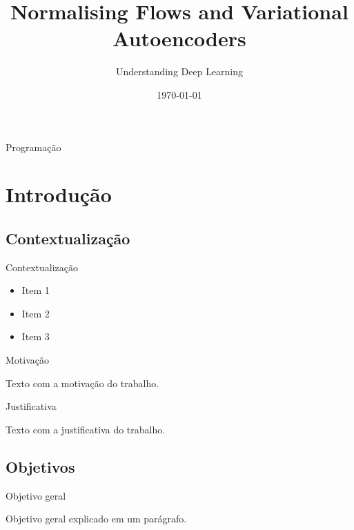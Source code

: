 \documentclass{if-beamer}
\title[Normalising Flows and Variational Autoencoders]{\textbf{Normalising Flows and Variational Autoencoders}}
\subtitle{Understanding Deep Learning}
\institute[Uni OS]{
    \small \textit{University of Osnabrück} \\
    \textit{Koray Geciml, Elias Brand, Hajar Fatane}
}
\date{\today}
\begin{document}
\begin{frame}
  \titlepage
\end{frame}

\begin{frame}{Programação}
  \tableofcontents
\end{frame}



\section{Introdução}

\subsection{Contextualização}
\begin{frame}{Contextualização}

    \begin{itemize}
        \item Item 1
        \item Item 2
        \item Item 3
    \end{itemize}

\end{frame}

\begin{frame}{Motivação}

    Texto com a motivação do trabalho.

\end{frame}

\begin{frame}{Justificativa}

    Texto com a justificativa do trabalho.

\end{frame}

\subsection{Objetivos}
\begin{frame}{Objetivo geral}

    Objetivo geral explicado em um parágrafo.

\end{frame}
\end{document}
